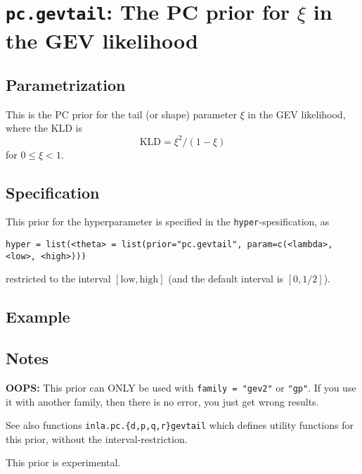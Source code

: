 \documentclass[a4paper,11pt]{article}
\begin{document}
\section*{\texttt{pc.gevtail}: The PC prior for $\xi$ in the GEV likelihood}

\subsection*{Parametrization}

This is the PC prior for the tail (or shape) parameter $\xi$ in the
GEV likelihood, where the KLD is
\begin{displaymath}
    \text{KLD} = \xi^{2}/(1-\xi)
\end{displaymath}
for $0 \le \xi < 1$.

\subsection*{Specification}
This prior for the hyperparameter is specified in the
\texttt{hyper}-spesification, as
\begin{center}
    \texttt{hyper = list(<theta> = list(prior="pc.gevtail", param=c(<lambda>, <low>, <high>)))}
\end{center}
restricted to the interval $[\text{low}, \text{high}]$ (and the
default interval is $[0,1/2]$).

\subsection*{Example}

\subsection*{Notes}

\textbf{OOPS:} This prior can ONLY be used with \texttt{family =
    "gev2"} or \texttt{"gp"}. If you use it with another family, then
there is no error, you just get wrong results.

See also functions \texttt{inla.pc.\{d,p,q,r\}gevtail} which defines
utility functions for this prior, without the interval-restriction.

This prior is experimental.
\end{document}
